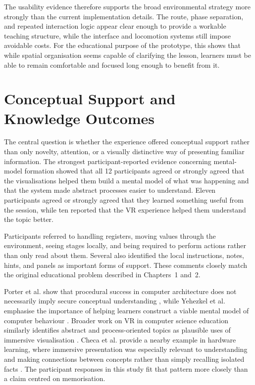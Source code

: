 The usability evidence therefore supports the broad environmental strategy more strongly than the current implementation details. The route, phase separation, and repeated interaction logic appear clear enough to provide a workable teaching structure, while the interface and locomotion systems still impose avoidable costs. For the educational purpose of the prototype, this shows that while spatial organisation seems capable of clarifying the lesson, learners must be able to remain comfortable and focused long enough to benefit from it.

\section{Conceptual Support and Knowledge Outcomes}

The central question is whether the experience offered conceptual support rather than only novelty, attention, or a visually distinctive way of presenting familiar information. The strongest participant-reported evidence concerning mental-model formation showed that all 12 participants agreed or strongly agreed that the visualisations helped them build a mental model of what was happening and that the system made abstract processes easier to understand. Eleven participants agreed or strongly agreed that they learned something useful from the session, while ten reported that the VR experience helped them understand the topic better.

Participants referred to handling registers, moving values through the environment, seeing stages locally, and being required to perform actions rather than only read about them. Several also identified the local instructions, notes, hints, and panels as important forms of support. These comments closely match the original educational problem described in Chapters~1 and~2. 

Porter et al. show that procedural success in computer architecture does not necessarily imply secure conceptual understanding \cite{porter2013evaluating}, while Yehezkel et al. emphasise the importance of helping learners construct a viable mental model of computer behaviour \cite{yehezkel2007contribution}. Broader work on VR in computer science education similarly identifies abstract and process-oriented topics as plausible uses of immersive visualisation \cite{pirker2020virtual,agbo2021application,janani2026virtual}. Checa et al. provide a nearby example in hardware learning, where immersive presentation was especially relevant to understanding and making connections between concepts rather than simply recalling isolated facts \cite{checa2023immersive}. The participant responses in this study fit that pattern more closely than a claim centred on memorisation.

